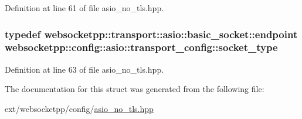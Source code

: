 Definition at line 61 of file asio\+\_\+no\+\_\+tls.\+hpp.

\hypertarget{structwebsocketpp_1_1config_1_1asio_1_1transport__config_a7ad5fe6e1bb71633a8d75125a8388c43}{}
\subsubsection[{socket\+\_\+type}]{\setlength{\rightskip}{0pt plus 5cm}typedef {\bf websocketpp\+::transport\+::asio\+::basic\+\_\+socket\+::endpoint} {\bf websocketpp\+::config\+::asio\+::transport\+\_\+config\+::socket\+\_\+type}}\label{structwebsocketpp_1_1config_1_1asio_1_1transport__config_a7ad5fe6e1bb71633a8d75125a8388c43}


Definition at line 63 of file asio\+\_\+no\+\_\+tls.\+hpp.



The documentation for this struct was generated from the following file\+:\begin{DoxyCompactItemize}
\item 
ext/websocketpp/config/\hyperlink{asio__no__tls_8hpp}{asio\+\_\+no\+\_\+tls.\+hpp}\end{DoxyCompactItemize}
